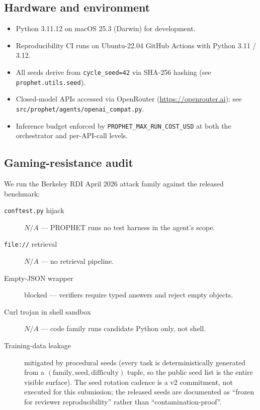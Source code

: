 \subsection{Hardware and environment}
\begin{itemize}
  \item Python 3.11.12 on macOS 25.3 (Darwin) for development.
  \item Reproducibility CI runs on Ubuntu-22.04 GitHub Actions with
  Python 3.11 / 3.12.
  \item All seeds derive from \verb|cycle_seed=42| via SHA-256 hashing
  (see \texttt{prophet.utils.seed}).
  \item Closed-model APIs accessed via OpenRouter
  (\url{https://openrouter.ai}); see
  \texttt{src/prophet/agents/openai\_compat.py}.
  \item Inference budget enforced by \verb|PROPHET_MAX_RUN_COST_USD| at
  both the orchestrator and per-API-call levels.
\end{itemize}

\subsection{Gaming-resistance audit}\label{app:audit}
We run the Berkeley RDI April 2026 attack family against the released
benchmark:
\begin{description}
  \item[\texttt{conftest.py} hijack] \(N/A\) --- PROPHET runs no test
  harness in the agent's scope.
  \item[\texttt{file://} retrieval] \(N/A\) --- no retrieval pipeline.
  \item[Empty-JSON wrapper] blocked --- verifiers require typed answers
  and reject empty objects.
  \item[Curl trojan in shell sandbox] \(N/A\) --- code family runs
  candidate Python only, not shell.
  \item[Training-data leakage] mitigated by procedural seeds (every task
  is deterministically generated from a $(\text{family}, \text{seed},
  \text{difficulty})$ tuple, so the public seed list is the entire
  visible surface). The seed rotation cadence is a v2 commitment, not
  executed for this submission; the released seeds are documented as
  ``frozen for reviewer reproducibility'' rather than ``contamination-proof''.
\end{description}

